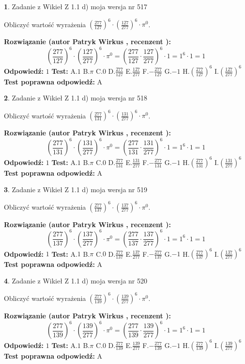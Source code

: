 \documentclass[12pt, a4paper]{article}
\theoremstyle{definition} %
\newtheorem{zad}{}
\newcommand{\zadStart}[1]{\begin{zad}#1\newline}
\newcommand{\zadStop}{\end{zad}}
\newcommand{\rozwStart}[2]{\noindent \textbf{Rozwiązanie (autor #1 , recenzent #2): }\newline}
\newcommand{\rozwStop}{\newline}
\newcommand{\odpStart}{\noindent \textbf{Odpowiedź:}\newline}
\newcommand{\odpStop}{\newline}
\newcommand{\testStart}{\noindent \textbf{Test:}\newline}
\newcommand{\testStop}{\newline}
\newcommand{\kluczStart}{\noindent \textbf{Test poprawna odpowiedź:}\newline}
\newcommand{\kluczStop}{\newline}
\begin{document}
\zadStart{Zadanie z Wikieł Z 1.1 d) moja wersja nr 517}

Obliczyć wartość wyrażenia $(\frac{277}{127})^{6} \cdot (\frac{127}{277})^{6} \cdot \pi^{0}$.
\zadStop
\rozwStart{Patryk Wirkus}{}
$$(\frac{277}{127})^{6} \cdot (\frac{127}{277})^{6} \cdot \pi^{0} = (\frac{277}{127} \cdot \frac{127}{277})^{6} \cdot 1 = 1^{6} \cdot 1 = 1$$
\rozwStop
\odpStart
$1$
\odpStop
\testStart
A.$1$ B.$\pi$ C.$0$ D.$\frac{277}{127}$ E.$\frac{127}{277}$
F.$-\frac{277}{127}$ G.$-1$
H.$(\frac{277}{127})^{6}$
I.$(\frac{127}{277})^{6}$
\testStop
\kluczStart
A
\kluczStop



\zadStart{Zadanie z Wikieł Z 1.1 d) moja wersja nr 518}

Obliczyć wartość wyrażenia $(\frac{277}{131})^{6} \cdot (\frac{131}{277})^{6} \cdot \pi^{0}$.
\zadStop
\rozwStart{Patryk Wirkus}{}
$$(\frac{277}{131})^{6} \cdot (\frac{131}{277})^{6} \cdot \pi^{0} = (\frac{277}{131} \cdot \frac{131}{277})^{6} \cdot 1 = 1^{6} \cdot 1 = 1$$
\rozwStop
\odpStart
$1$
\odpStop
\testStart
A.$1$ B.$\pi$ C.$0$ D.$\frac{277}{131}$ E.$\frac{131}{277}$
F.$-\frac{277}{131}$ G.$-1$
H.$(\frac{277}{131})^{6}$
I.$(\frac{131}{277})^{6}$
\testStop
\kluczStart
A
\kluczStop



\zadStart{Zadanie z Wikieł Z 1.1 d) moja wersja nr 519}

Obliczyć wartość wyrażenia $(\frac{277}{137})^{6} \cdot (\frac{137}{277})^{6} \cdot \pi^{0}$.
\zadStop
\rozwStart{Patryk Wirkus}{}
$$(\frac{277}{137})^{6} \cdot (\frac{137}{277})^{6} \cdot \pi^{0} = (\frac{277}{137} \cdot \frac{137}{277})^{6} \cdot 1 = 1^{6} \cdot 1 = 1$$
\rozwStop
\odpStart
$1$
\odpStop
\testStart
A.$1$ B.$\pi$ C.$0$ D.$\frac{277}{137}$ E.$\frac{137}{277}$
F.$-\frac{277}{137}$ G.$-1$
H.$(\frac{277}{137})^{6}$
I.$(\frac{137}{277})^{6}$
\testStop
\kluczStart
A
\kluczStop



\zadStart{Zadanie z Wikieł Z 1.1 d) moja wersja nr 520}

Obliczyć wartość wyrażenia $(\frac{277}{139})^{6} \cdot (\frac{139}{277})^{6} \cdot \pi^{0}$.
\zadStop
\rozwStart{Patryk Wirkus}{}
$$(\frac{277}{139})^{6} \cdot (\frac{139}{277})^{6} \cdot \pi^{0} = (\frac{277}{139} \cdot \frac{139}{277})^{6} \cdot 1 = 1^{6} \cdot 1 = 1$$
\rozwStop
\odpStart
$1$
\odpStop
\testStart
A.$1$ B.$\pi$ C.$0$ D.$\frac{277}{139}$ E.$\frac{139}{277}$
F.$-\frac{277}{139}$ G.$-1$
H.$(\frac{277}{139})^{6}$
I.$(\frac{139}{277})^{6}$
\testStop
\kluczStart
A
\kluczStop
\end{document}
